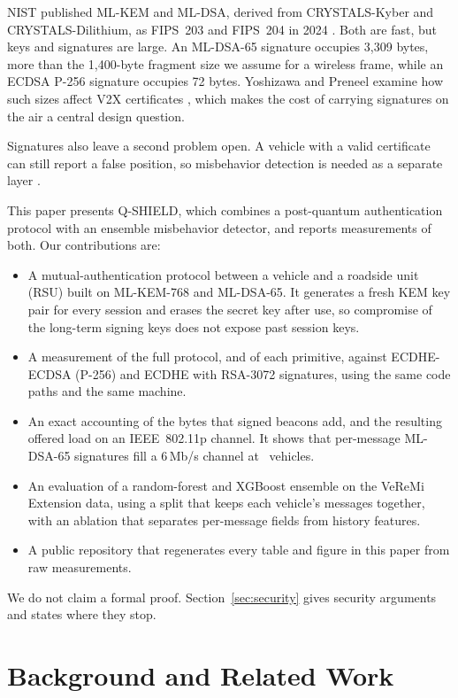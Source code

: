 \documentclass[journal,twoside]{IEEEtran}
\begin{document}
NIST published ML-KEM and ML-DSA, derived from CRYSTALS-Kyber and CRYSTALS-Dilithium, as FIPS~203 and FIPS~204 in 2024 \cite{fips203,fips204}. Both are fast, but keys and signatures are large. An ML-DSA-65 signature occupies 3{,}309 bytes, more than the 1{,}400-byte fragment size we assume for a wireless frame, while an ECDSA P-256 signature occupies 72 bytes. Yoshizawa and Preneel examine how such sizes affect V2X certificates \cite{yoshizawa2023vtc}, which makes the cost of carrying signatures on the air a central design question.

Signatures also leave a second problem open. A vehicle with a valid certificate can still report a false position, so misbehavior detection is needed as a separate layer \cite{sedar2025,kristianto2023,mansourian2025}.

This paper presents Q-SHIELD, which combines a post-quantum authentication protocol with an ensemble misbehavior detector, and reports measurements of both. Our contributions are:
\begin{itemize}
\item A mutual-authentication protocol between a vehicle and a roadside unit (RSU) built on ML-KEM-768 and ML-DSA-65. It generates a fresh KEM key pair for every session and erases the secret key after use, so compromise of the long-term signing keys does not expose past session keys.
\item A measurement of the full protocol, and of each primitive, against ECDHE-ECDSA (P-256) and ECDHE with RSA-3072 signatures, using the same code paths and the same machine.
\item An exact accounting of the bytes that signed beacons add, and the resulting offered load on an IEEE~802.11p channel. It shows that per-message ML-DSA-65 signatures fill a 6\,Mb/s channel at \ovQCap\ vehicles.
\item An evaluation of a random-forest and XGBoost ensemble on the VeReMi Extension data, using a split that keeps each vehicle's messages together, with an ablation that separates per-message fields from history features.
\item A public repository that regenerates every table and figure in this paper from raw measurements.
\end{itemize}

We do not claim a formal proof. Section~\ref{sec:security} gives security arguments and states where they stop.

\section{Background and Related Work}
\label{sec:related}
\end{document}
